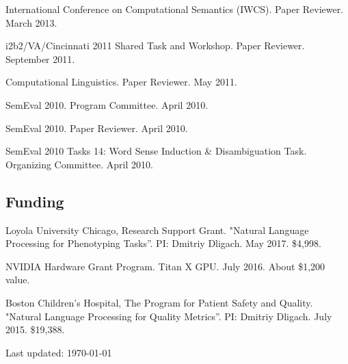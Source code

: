 \documentclass[letterpaper]{article}
\renewenvironment{itemize}{
  \begin{list}{}{
    \setlength{\leftmargin}{1.5em}
  }
}{
  \end{list}
}
\begin{document}
\begin{itemize}
\item International Conference on Computational Semantics (IWCS). Paper Reviewer. March 2013.
\item i2b2/VA/Cincinnati 2011 Shared Task and Workshop. Paper Reviewer. September 2011.
\item Computational Linguistics. Paper Reviewer. May 2011.
\item SemEval 2010. Program Committee. April 2010.
\item SemEval 2010. Paper Reviewer. April 2010.
\item SemEval 2010 Tasks 14: Word Sense Induction \& Disambiguation Task. Organizing Committee. April 2010.
\end{itemize}

\subsection*{Funding}
\begin{itemize}
\item Loyola University Chicago, Research Support Grant. "Natural Language Processing for Phenotyping Tasks''. PI: Dmitriy Dligach. May 2017. \$4,998.
\item NVIDIA Hardware Grant Program. Titan X GPU. July 2016. About \$1,200 value.
\item Boston Children's Hospital, The Program for Patient Safety and Quality. "Natural Language Processing for Quality Metrics''. PI: Dmitriy Dligach. July 2015. \$19,388.
\end{itemize}


\bigskip

\begin{center}
\begin{footnotesize}
Last updated: \today \\
\end{footnotesize}
\end{center}
\end{document}
